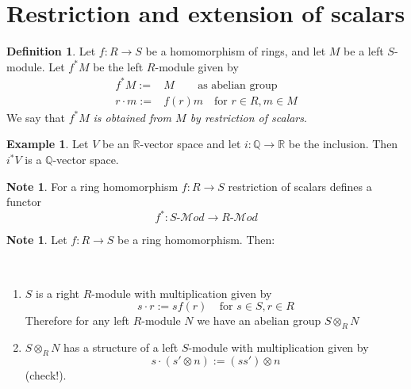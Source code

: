 \documentclass[12pt, letterpaper, oneside]{article}
\theoremstyle{plain}
\theoremstyle{definition}
\newtheorem{definition}[theorem]{Definition}
\newtheorem{example}[theorem]{Example}
\newtheorem{note}[theorem]{Note}
\newcommand{\lra}{\longrightarrow}
\newcommand{\Q}{{\mathbb Q}}
\newcommand{\R}{{\mathbb R}}
\newcommand{\Mod}{{\mathcal Mod}}
\newcommand{\benu}{\begin{enumerate}}
\newcommand{\eenu}{\end{enumerate}}
\newcommand{\vs}{\vskip 5mm}
\begin{document}


\newpage
\section{Restriction and extension of scalars}
\label{SEC_RESEXTSCALARS}


\begin{definition}
Let $f\colon R\to S$ be a homomorphism of rings, and let $M$ be a left $S$-module. 
Let $f^{\ast}M$ be the left $R$-module given by
\begin{align*}
f^{\ast}M :=  & M   \ \ \ \ \ \ \ \ \text{ as abelian group} \\[2mm]
r\cdot m :=  & f(r)m   \ \ \ \text{ for } r\in R, m\in M
\end{align*}
We say that $f^{\ast}M$  \emph{ is obtained from $M$ by restriction of scalars}.
\end{definition}


\vs\vs

\begin{example} Let $V$ be an $\R$-vector space and let $i\colon \Q \to \R$ be the inclusion. 
Then $i^{\ast}V$ is a $\Q$-vector space. 
\end{example}




\vs\vs

\begin{note}
For a ring homomorphism $f\colon R \to S$ restriction of scalars defines a 
functor 
$$f^{\ast} \colon S\text{-}\Mod \lra R\text{-}\Mod$$
\end{note}

\vs\vs

\begin{note}
Let $f\colon R \to S$ be a ring homomorphism. Then:

\vskip -13mm

\ 
\benu
\item $S$ is a right $R$-module with multiplication given by 
$$s\cdot r := sf(r) \ \ \ \ \ \text{for } s\in S, r\in R $$
Therefore for any left $R$-module $N$ we have an abelian group $S\otimes_{R}N$
\item $S\otimes_{R}N$ has a structure of a left $S$-module with multiplication given by 
$$s\cdot (s'\otimes n) := (ss')\otimes n$$
(check!).
\eenu

\end{note}
\end{document}
